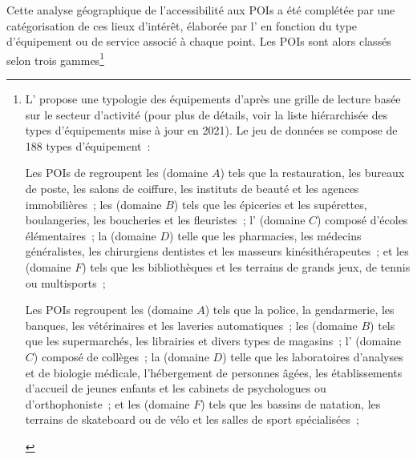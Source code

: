 \begin{refsegment}
Cette analyse géographique de l'accessibilité aux \acrshort{POIs} a été complétée par une catégorisation de ces lieux d'intérêt, élaborée par l'\textcolor{blue}{\textcite{insee_base_2021}} en fonction du type d'équipement ou de service associé à chaque point. Les \acrshort{POIs} sont alors classés selon trois gammes\footnote{
    L'\textcolor{blue}{\textcite{insee_base_2021}} propose une typologie des équipements d'après une grille de lecture basée sur le secteur d'activité (pour plus de détails, voir la liste hiérarchisée des types d'équipements mise à jour en 2021). Le jeu de données se compose de 188 types d'équipement~:
    \begin{customitemize}
        \item Les \acrshort{POIs} de  regroupent les  (domaine \(A\)) tels que la restauration, les bureaux de poste, les salons de coiffure, les instituts de beauté et les agences immobilières~; les  (domaine \(B\)) tels que les épiceries et les supérettes, boulangeries, les boucheries et les fleuristes~; l' (domaine \(C\)) composé d'écoles élémentaires~; la  (domaine \(D\)) telle que les pharmacies, les médecins généralistes, les chirurgiens dentistes et les masseurs kinésithérapeutes~; et les  (domaine \(F\)) tels que les bibliothèques et les terrains de grands jeux, de tennis ou multisports~;
        \item Les \acrshort{POIs}  regroupent les  (domaine \(A\)) tels que la police, la gendarmerie, les banques, les vétérinaires et les laveries automatiques~; les  (domaine \(B\)) tels que les supermarchés, les librairies et divers types de magasins~; l' (domaine \(C\)) composé de collèges~; la  (domaine \(D\)) telle que les laboratoires d'analyses et de biologie médicale, l'hébergement de personnes âgées, les établissements d'accueil de jeunes enfants et les cabinets de psychologues ou d'orthophoniste~; et les  (domaine \(F\)) tels que les bassins de natation, les terrains de skateboard ou de vélo et les salles de sport spécialisées~;

\end{customitemize}}
\end{refsegment}
